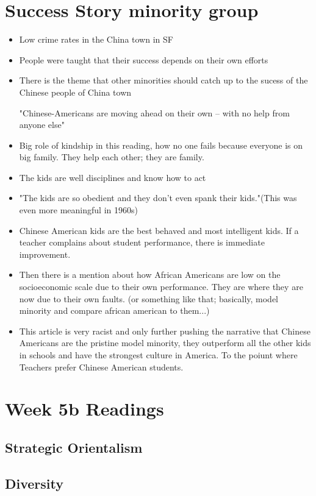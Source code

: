 \documentclass{article}
\begin{document}
  \section{Success Story minority group}
  \begin{itemize}
    \item Low crime rates in the China town in SF
    \item People were taught that their success depends on their own efforts
    \item There is the theme that other minorities should catch up
      to the sucess of the Chinese people of China town

      "Chinese-Americans are moving ahead on their own -- with no help from anyone else"
    \item Big role of kindship in this reading, how no one fails
      because everyone is on big family. They help each other; they are family.
    \item The kids are well disciplines and know how to act
    \item "The kids are so obedient and they don't even spank their kids."(This was even more meaningful in 1960s)
    \item Chinese American kids are the best behaved and most intelligent kids.
      If a teacher complains about student performance, there is immediate improvement.
    \item Then there is a mention about how African Americans are low on the socioeconomic scale
      due to their own performance. They are where they are now due to their own faults.
      (or something like that; basically, model minority and compare african american to them...)
    \item This article is very racist and only further pushing the narrative that Chinese Americans
      are the pristine model minority, they outperform all the other kids in schools and have
      the strongest culture in America. To the poiunt where Teachers prefer Chinese American students.
  \end{itemize}

  \section*{Week 5b Readings}
  \subsection{Strategic Orientalism}
  \subsection{Diversity}
\end{document}
